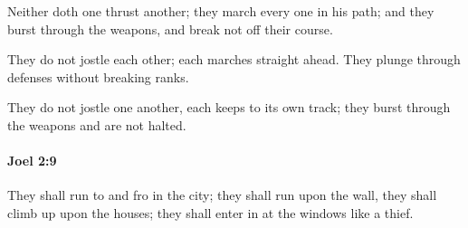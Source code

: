 			\begin{versebox}
					\item[BHS] 
					\item[LXX] 
					\item[ASV] Neither doth one thrust another; they march every one in his path; and they burst through the weapons, and break not off their course.
					\item[NIV] They do not jostle each other; each marches straight ahead. They plunge through defenses without breaking ranks.
					\item[NRSV] They do not jostle one another, each keeps to its own track; they burst through the weapons and are not halted.
			\end{versebox}

		\paragraph{Joel 2:9} %
			\label{JOEL-2-9}

			They shall run to and fro in the city; they shall run upon the wall, they shall climb up upon the houses; they shall enter in at the windows like a thief.

